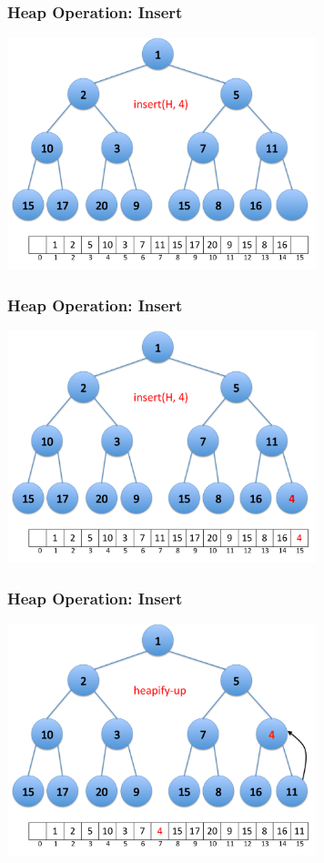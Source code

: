 \documentclass{beamer}
\begin{document}
\begin{frame}[containsverbatim]
\frametitle{Heap Operation: Insert}

\begin{center}
\includegraphics[width=9cm]{heap_insert1.pdf}
\end{center}

\end{frame}

\begin{frame}[containsverbatim]
\frametitle{Heap Operation: Insert}

\begin{center}
\includegraphics[width=9cm]{heap_insert2.pdf}
\end{center}

\end{frame}

\begin{frame}[containsverbatim]
\frametitle{Heap Operation: Insert}

\begin{center}
\includegraphics[width=9cm]{heap_insert3.pdf}
\end{center}

\end{frame}
\end{document}
